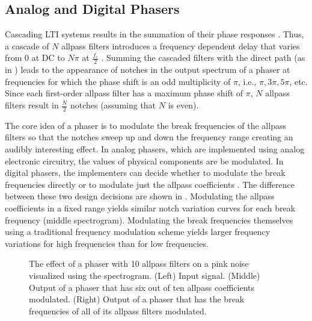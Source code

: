 \subsection{Analog and Digital Phasers}

Cascading \ac{LTI} systems results in the summation of their phase responses \cite{Oppenheim1997}. Thus, a cascade of $N$ allpass filters introduces a frequency dependent delay that varies from 0 at DC to $N\pi$ at $\frac{f_c}{2}$ \cite{PASPWEB2010}. Summing the cascaded filters with the direct path (as in ) leads to the appearance of notches in the output spectrum of a phaser at frequencies for which the phase shift is an odd multiplicity of $\pi$, i.e., $\pi, 3\pi, 5\pi$, etc. Since each first-order allpass filter has a maximum phase shift of $\pi$, $N$ allpass filters result in $\frac{N}{2}$ notches (assuming that $N$ is even).

The core idea of a phaser is to modulate the break frequencies of the allpass filters so that the notches sweep up and down the frequency range creating an audibly interesting effect. In analog phasers, which are implemented using analog electronic circuitry, the values of physical components are be modulated. In digital phasers, the implementers can decide whether to modulate the break frequencies directly or to modulate just the allpass coefficients \cite{Kiiski2016}. The difference between these two design decisions are shown in . Modulating the allpass coefficients in a fixed range yields similar notch variation curves for each break frequency (middle spectrogram). Modulating the break frequencies themselves using a traditional frequency modulation scheme yields larger frequency variations for high frequencies than for low frequencies.

\newcommand{\scaleboxsize}{0.7}
\newcommand{\subfigurewidththree}{0.3\textwidth}
\begin{figure}
    \begin{subfigure}{0.35\textwidth}
        \centering
        \scalebox{\scaleboxsize}{}
    \end{subfigure}
    \begin{subfigure}{0.28\textwidth}
        \centering
        \scalebox{\scaleboxsize}{}
    \end{subfigure}
    \begin{subfigure}{0.28\textwidth}
        \centering
        \scalebox{\scaleboxsize}{}
    \end{subfigure}
    \caption{The effect of a phaser with 10 allpass filters on a pink noise visualized using the spectrogram. (Left) Input signal. (Middle) Output of a phaser that has six out of ten allpass coefficients modulated. (Right) Output of a phaser that has the break frequencies of all of its allpass filters modulated.}
    \label{fig:pink_noise_phasered}
\end{figure}

